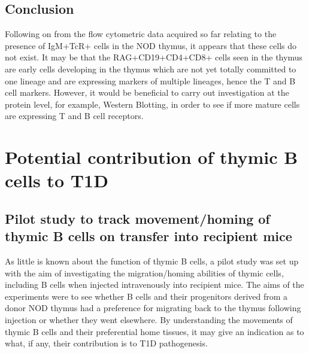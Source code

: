 

\subsection{Conclusion}
Following on from the flow cytometric data acquired so far relating to the presence of IgM+TcR+ cells in the NOD thymus, it appears that these cells do not exist. 
It may be that the RAG+CD19+CD4+CD8+ cells seen in the thymus are early cells developing in the thymus which are not yet totally committed to one lineage and are expressing markers of multiple lineages, hence the T and B cell markers.
However, it would be beneficial to carry out investigation at the protein level, for example, Western Blotting, in order to see if more mature cells are expressing T and B cell receptors.




\section{Potential contribution of thymic B cells to T1D}

\subsection{Pilot study to track movement/homing of thymic B cells on transfer into recipient mice}



As little is known about the function of thymic B cells, a pilot study was set up with the aim of investigating the migration/homing abilities of thymic cells, including B cells when injected intravenously into recipient mice.
The aims of the experiments were to see whether B cells and their progenitors derived from a donor NOD thymus had a preference for migrating back to the thymus following injection or whether they went elsewhere.
By understanding the movements of thymic B cells and their preferential home tissues, it may give an indication as to what, if any, their contribution is to T1D pathogenesis.

